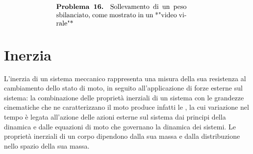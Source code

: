 \documentclass[letterpaper,10pt,italian]{jupyterBook}
\begin{document}
\sphinxAtStartPar
{}
\begin{equation*}
\begin{split}
\begin{minipage}[t]{.55\textwidth}
  \vspace{0pt}
  \textbf{Problema 16.}
  Sollevamento di un peso sbilanciato, come mostrato in un *"video virale"*
\end{minipage}
\hspace{.05\textwidth}
\begin{minipage}[t]{.40\textwidth}
\end{minipage}
\end{split}
\end{equation*}
\sphinxAtStartPar
{}

\sphinxstepscope




\chapter{Inerzia}
\label{\detokenize{ch/mechanics/inertia:inerzia}}\label{\detokenize{ch/mechanics/inertia:physics-hs-mechanics-inertia}}\label{\detokenize{ch/mechanics/inertia::doc}}
\sphinxAtStartPar
L’inerzia di un sistema meccanico rappresenta una misura della sua resistenza al cambiamento dello stato di moto, in seguito all’applicazione di forze esterne sul sistema: la combinazione delle proprietà inerziali di un sistema con le grandezze cinematiche che ne caratterizzano il moto produce infatti le , la cui variazione nel tempo è legata all’azione delle azioni esterne sul sistema dai principi della dinamica e dalle equazioni di moto che governano la dinamica dei sistemi.
Le proprietà inerziali di un corpo dipendono dalla sua massa e dalla distribuzione nello spazio della sua massa.
\end{document}

